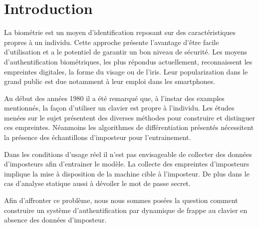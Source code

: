 \section{Introduction}

La biométrie est un moyen d’identification reposant sur des caractéristiques propres à un individu. Cette approche présente l'avantage d'être facile d'utilisation et a le potentiel de garantir un bon niveau de sécurité. Les moyens d'authentification biométriques, les plus répondus actuellement, reconnaissent les empreintes digitales, la forme du visage ou de l’iris. Leur popularization dans le grand public est due notamment à leur emploi dans les smartphones. 

Au début des années 1980 il a été remarqué que, à l’instar des examples mentionnés, la façon d’utiliser un clavier est propre à l’individu. Les études menées sur le sujet présentent des diverses méthodes pour construire et distinguer ces empreintes. Néanmoins les algorithmes de différentiation présentés nécessitent la présence des échantillons d’imposteur pour l'entrainement. 

Dans les conditions d'usage réel il n'est pas envisageable de collecter des données d’imposteurs afin d'entrainer le modèle. La collecte des empreintes d’imposteurs implique la mise à disposition de la machine cible à l’imposteur. De plus dans le cas d’analyse statique aussi à dévoiler le mot de passe secret. 

Afin d’affronter ce problème, nous nous sommes posées la question comment construire un système d'authentification par dynamique de frappe au clavier en absence des données d’imposteur.


